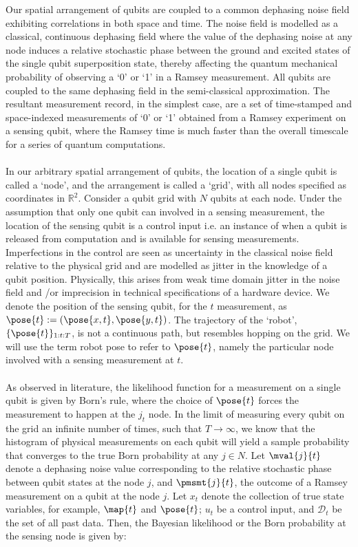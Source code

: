 Our spatial arrangement of qubits are coupled to a common dephasing noise field exhibiting correlations in both space and time. The noise field is modelled as a classical, continuous dephasing field where the value of the dephasing noise at any node induces a relative stochastic phase between the ground and excited states of the single qubit superposition state, thereby affecting the  quantum mechanical probability of observing a  `0' or `1' in a Ramsey measurement. All qubits are coupled to the same dephasing field in the semi-classical approximation. The resultant measurement record, in the simplest case, are a set of time-stamped and space-indexed measurements of `0' or `1' obtained from a Ramsey experiment on a sensing qubit, where the Ramsey time is much faster than the overall timescale for a series of quantum computations. \\
\\
In our arbitrary spatial arrangement of qubits, the location of a single qubit is called a `node', and the arrangement is called a `grid', with all nodes specified as coordinates in $\mathbb{R}^2$. Consider a qubit grid with $N$ qubits at each node. Under the assumption that only one qubit can involved in a sensing measurement, the location of the sensing qubit is a control input i.e. an instance of when a qubit is released from computation and is available for sensing measurements. Imperfections in the control are seen as uncertainty in the classical noise field relative to the physical grid and are modelled as jitter in the knowledge of a qubit position. Physically, this arises from weak time domain jitter in the noise field and /or imprecision in technical specifications of a hardware device. We denote the position of the sensing qubit, for the $t$ measurement, as $\pose{t}:= (\pose{x,t}, \pose{y,t})$.  The trajectory of the `robot',$\{\pose{t}\}_{1:t:T}$, is not a continuous path, but resembles hopping on the grid. We will use the term robot pose to refer to $\pose{t}$, namely the particular node involved with a sensing measurement at $t$.\\
\\
As observed in literature, the likelihood function for a measurement on a single qubit is given by Born's rule, where the choice of $\pose{t}$ forces the measurement to happen at the $j_t$ node. In the limit of measuring every qubit on the grid an infinite number of times, such that $T \to \infty$, we know that the histogram of physical measurements on each qubit will yield a sample probability that converges to the true Born probability at any $j \in N$. Let $\mval{j}{t}$ denote a  dephasing noise value corresponding to the relative stochastic phase between qubit states at the node $j$, and $\pmsmt{j}{t}$, the outcome of a Ramsey measurement on a qubit at the node $j$. Let $x_t$ denote the collection of true state variables, for example, $\map{t}$ and $\pose{t}$; $u_t$ be a control input, and $\mathcal{D}_t$ be the set of all past data. Then, the Bayesian likelihood or the Born probability at the sensing node is given by:

